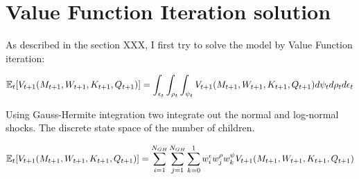 \section{Value Function Iteration solution}

As described in the section XXX, I first try to solve the model by Value Function iteration:

\begin{equation}
    \mathbb{E}_{t}[V_{t+1}(M_{t+1}, W_{t+1}, K_{t+1}, Q_{t+1})] = \int_{\epsilon_{t}}  \int_{\rho_{t}} \int_{\psi_{t}} V_{t+1} (M_{t+1}, W_{t+1}, K_{t+1}, Q_{t+1}) d \psi_{t} d\rho_{t}  d \epsilon_{t}
\end{equation}

Using Gauss-Hermite integration two integrate out the normal and log-normal shocks. The discrete state space of the number of children.

\begin{equation}
    \mathbb{E}_{t}[V_{t+1}(M_{t+1}, W_{t+1}, K_{t+1}, Q_{t+1})] =  \sum_{i=1}^{N_{GH}} \sum_{j=1}^{N_{GH}} \sum_{k=0}^{1} w_{i}^{\epsilon} w_j^{\rho} w_{k}^{\psi}   V_{t+1} (M_{t+1}, W_{t+1}, K_{t+1}, Q_{t+1}) 
\end{equation}    
